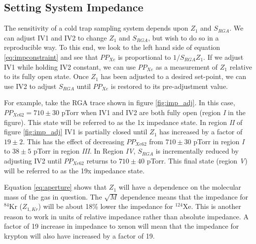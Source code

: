\subsection{Setting System Impedance}
\label{sec:imp_set}
The sensitivity of a cold trap sampling system depends upon $Z_1$ and $S_{RGA}$. We can adjust IV1 and IV2 to change $Z_1$ and $S_{RGA}$, but wish to do so in a reproducible way. To this end, we look to the left hand side of equation \ref{eq:impconstraint} and see that $PP_{Xe}$ is proportional to $1/S_{RGA}Z_1$. If we adjust IV1 while holding IV2 constant, we can use $PP_{Xe}$ as a measurement of $Z_1$ relative to its fully open state. Once $Z_1$ has been adjusted to a desired set-point, we can use IV2 to adjust $S_{RGA}$ until $PP_{Xe}$ is restored to its pre-adjustment value.

For example, take the RGA trace shown in figure \ref{fig:imp_adj}. In this case, $PP_{Xe62}= 710 \pm30$ pTorr when IV1 and IV2 are both fully open (region \emph{I} in the figure). This state will be referred to as the 1x impedance state. In region \emph{II} of figure \ref{fig:imp_adj} IV1 is partially closed until $Z_1$ has increased by a factor of $19\pm2$. This has the effect of decreasing $PP_{Xe62}$ from $710\pm30$ pTorr in region \emph{I} to $38\pm5$ pTorr in region \emph{III}. In Region \emph{IV}, $S_{RGA}$ is incrementally reduced by adjusting IV2 until $PP_{Xe62}$ returns to $710\pm40$ pTorr. This final state (region \emph{V}) will be referred to as the 19x impedance state. 

Equation \ref{eq:aperture} shows that $Z_1$ will have a dependence on the molecular mass of the gas in question. The $\sqrt{M}$ dependence means that the impedance for $^{84}$Kr ($Z_{1,Kr}$) will be about 18\% lower the impedance for $^124$Xe. This is another reason to work in units of relative impedance rather than absolute impedance. A factor of 19 increase in impedance to xenon will mean that the impedance for krypton will also have increased by a factor of 19.

